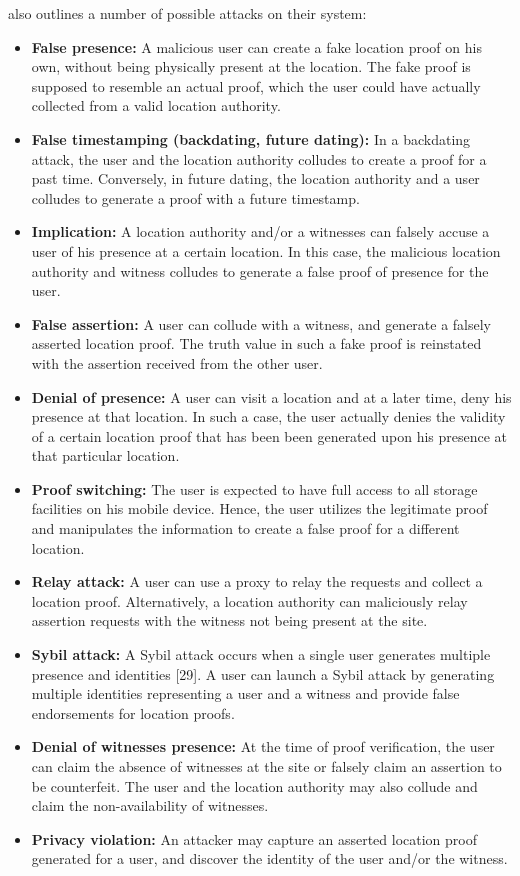 \documentclass[12pt]{article}
\begin{document}
\cite{khan} also outlines a number of possible attacks on their system:
\begin{itemize}
	\item \textbf{False presence:} A malicious user can create a fake location proof on his own, without being physically present at the location. The fake proof is supposed to resemble an actual proof, which the user could have actually collected from a valid location authority.
	\item \textbf{False timestamping (backdating, future dating):} In a backdating attack, the user and the location authority colludes to create a proof for a past time. Conversely, in future dating, the location authority and a user colludes to generate a proof with a future timestamp.
	\item \textbf{Implication:} A location authority and/or a witnesses can falsely accuse a user of his presence at a certain location. In this case, the malicious location authority and witness colludes to generate a false proof of presence for the user.
	\item \textbf{False assertion:} A user can collude with a witness, and generate a falsely asserted location proof. The truth value in such a fake proof is reinstated with the assertion received from the other user.
	\item \textbf{Denial of presence:} A user can visit a location and at a later time, deny his presence at that location. In such a case, the user actually denies the validity of a certain location proof that has been been generated upon his presence at that particular location.
	\item \textbf{Proof switching:} The user is expected to have full access to all storage facilities on his mobile device. Hence, the user utilizes the legitimate proof and manipulates the information to create a false proof for a different location.
	\item \textbf{Relay attack:} A user can use a proxy to relay the requests and collect a location proof. Alternatively, a location authority can maliciously relay assertion requests with the witness not being present at the site.
	\item \textbf{Sybil attack:} A Sybil attack occurs when a single user generates multiple presence and identities [29]. A user can launch a Sybil attack by generating multiple identities representing a user and a witness and provide false endorsements for location proofs.
	\item \textbf{Denial of witnesses presence:} At the time of proof verification, the user can claim the absence of witnesses at the site or falsely claim an assertion to be counterfeit. The user and the location authority may also collude and claim the non-availability of witnesses.
	\item \textbf{Privacy violation:} An attacker may capture an asserted location proof generated for a user, and discover the identity of the user and/or the witness.
\end{itemize}
\end{document}
